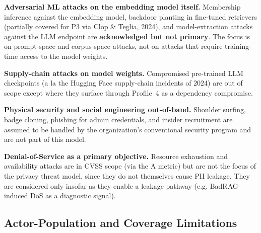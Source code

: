 \documentclass[12pt, a4paper]{report}
\begin{document}
\begin{limitbox}
\textbf{Adversarial ML attacks on the embedding model itself.}
Membership inference against the embedding model, backdoor planting in
fine-tuned retrievers (partially covered for P3 via Clop \& Teglia, 2024),
and model-extraction attacks against the LLM endpoint are
\textbf{acknowledged but not primary}. The focus is on prompt-space and
corpus-space attacks, not on attacks that require training-time access to
the model weights.

\textbf{Supply-chain attacks on model weights.} Compromised pre-trained
LLM checkpoints (a la the Hugging Face supply-chain incidents of 2024)
are out of scope except where they surface through Profile~4 as a
dependency compromise.

\textbf{Physical security and social engineering out-of-band.} Shoulder
surfing, badge cloning, phishing for admin credentials, and insider
recruitment are assumed to be handled by the organization's conventional
security program and are not part of this model.

\textbf{Denial-of-Service as a primary objective.} Resource exhaustion
and availability attacks are in CVSS scope (via the A metric) but are
not the focus of the privacy threat model, since they do not themselves
cause PII leakage. They are considered only insofar as they enable
a leakage pathway (e.g. BadRAG-induced DoS as a diagnostic signal).
\end{limitbox}

\subsection{Actor-Population and Coverage Limitations}
\end{document}
